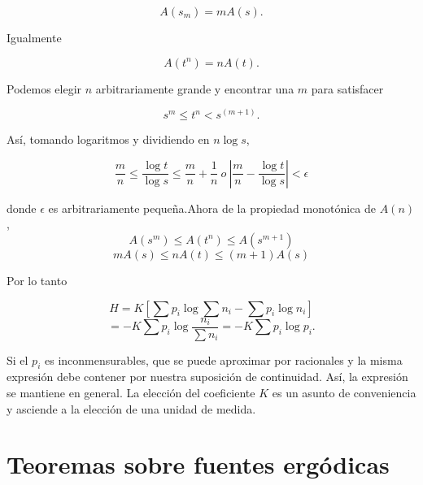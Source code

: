 \begin{appendices}
\begin{equation}
A(s_{m})=mA(s).
\end{equation}

Igualmente

\begin{equation}
A(t^{n})=nA(t).
\end{equation}

Podemos elegir $n$ arbitrariamente grande y encontrar una $m$ para satisfacer

\begin{equation}
s^{m} \leq t^{n} < s^{(m+1)}.
\end{equation}

As\'i, tomando logaritmos y dividiendo en $n\log s$,

\begin{equation}
\frac{m}{n}\leq \frac{\log  t}{\log  s}\leq \frac{m}{n}+\frac{1}{n} \ o \ 
\left|\frac{m}{n}-\frac{\log  t}{\log  s}\right| < \epsilon 
\end{equation}

donde $\epsilon$ es arbitrariamente peque\~na.Ahora de la propiedad 
monot\'onica de $A(n)$,
\begin{equation}
A(s^{m})\leq A(t^{n})\leq A(s^{m+1})
\end{equation}
\begin{equation}
mA(s)\leq nA(t) \leq (m+1)A(s)
\end{equation}

Por lo tanto

\begin{equation}
H=K\left[\sum p_{i}\log \sum n_{i}-\sum p_{i}\log n_{i}\right]
\end{equation}
\begin{equation}
=-K\sum p_{i}\log \frac{n_{i}}{\sum n_{i}}=-K\sum p_{i}\log p_{i}.
\end{equation}

Si el $p_{i}$ es inconmensurables, que se puede aproximar por racionales y la misma 
expresi\'on debe contener por nuestra suposici\'on de continuidad. As\'i, la expresi\'on 
se mantiene en general. La elecci\'on del coeficiente $K$ es un asunto de conveniencia y 
asciende a la elecci\'on de una unidad de medida.

\clearpage

\chapter{Teoremas sobre fuentes erg\'odicas}
\label{aini:3}


\end{appendices}
